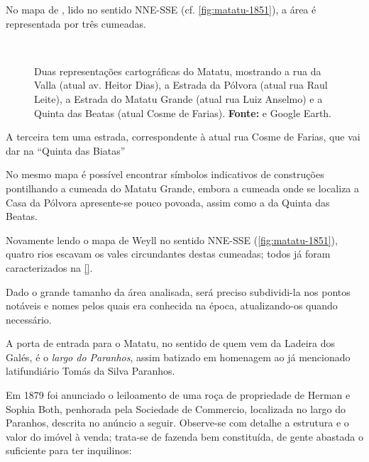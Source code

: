 No mapa de , lido no sentido NNE-SSE (cf. \autoref{fig:matatu-1851}), a área é representada por três cumeadas. 

\begin{figure}[!htp]
\centering
{}
\  %
\caption{Duas representações cartográficas do Matatu, mostrando a rua da Valla (atual av. Heitor Dias), a Estrada da Pólvora (atual rua Raul Leite), a Estrada do Matatu Grande (atual rua Luiz Anselmo) e a Quinta das Beatas (atual Cosme de Farias). \textbf{Fonte:}  e Google Earth.}
\end{figure}

A terceira tem uma estrada, correspondente à atual rua Cosme de Farias, que vai dar na ``Quinta das Biatas''
 
No mesmo mapa é possível encontrar símbolos indicativos de construções pontilhando a cumeada do Matatu Grande, embora a cumeada onde se localiza a Casa da Pólvora apresente-se pouco povoada, assim como a da Quinta das Beatas.

Novamente lendo o mapa de Weyll no sentido NNE-SSE (\autoref{fig:matatu-1851}), quatro rios escavam os vales circundantes destas cumeadas; todos já foram caracterizados na \autoref{}. 

Dado o grande tamanho da área analisada, será preciso subdividi-la nos pontos notáveis e nomes pelos quais era conhecida na época, atualizando-os quando necessário.

A porta de entrada para o Matatu, no sentido de quem vem da Ladeira dos Galés, é o \textit{largo do Paranhos}, assim batizado em homenagem ao já mencionado latifundiário Tomás da Silva Paranhos.

Em 1879 foi anunciado o leiloamento de uma roça de propriedade de Herman e Sophia Both, penhorada pela Sociedade de Commercio, localizada no largo do Paranhos, descrita no anúncio a seguir. Observe-se com detalhe a estrutura e o valor do imóvel à venda; trata-se de fazenda bem constituída, de gente abastada o suficiente para ter inquilinos:

